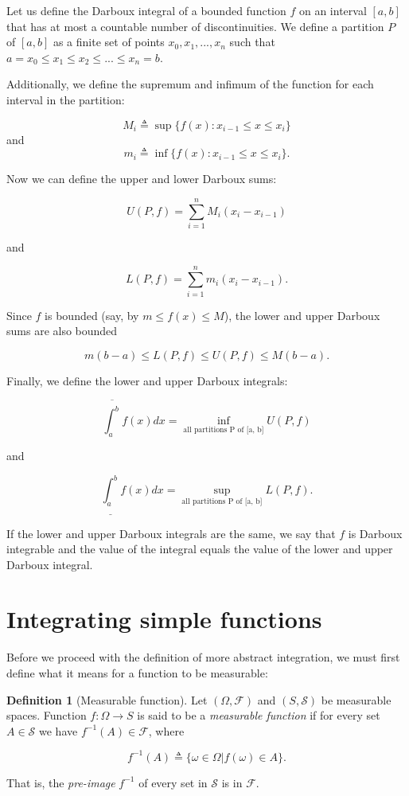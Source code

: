\documentclass{book}
\theoremstyle{plain}%
\theoremstyle{definition}
\newtheorem{definition}{Definition}[section]
\newlength{\arrow}
\begin{document}
Let us define the Darboux integral of a bounded function $f$ on an interval $[a,b]$ that has at most a countable number of discontinuities. We define a partition $P$ of $[a,b]$ as a finite set of points $x_0, x_1,...,x_n$ such that $a = x_0 \leq x_1 \leq x_2 \leq ... \leq x_n = b$.

Additionally, we define the supremum and infimum of the function for each interval in the partition:

$$M_i \triangleq \sup\{f(x): x_{i-1} \leq x \leq x_i \}$$ and $$m_i \triangleq \inf\{f(x): x_{i-1} \leq x \leq x_i \}.$$

Now we can define the upper and lower Darboux sums:

$$U(P, f) = \sum_{i=1}^n M_i (x_i - x_{i-1})$$

and

$$L(P, f) = \sum_{i=1}^n m_i (x_i - x_{i-1}).$$

Since $f$ is bounded (say, by $m \leq f(x) \leq M$), the lower and upper Darboux sums are also bounded

$$m(b-a) \leq L(P, f) \leq U(P, f) \leq M(b-a).$$

Finally, we define the lower and upper Darboux integrals:

$$\overline{\int_a^b} f(x)dx =  \inf_\text{all partitions P of [a, b]} U(P,f)$$

and

$$\underline{\int_a^b} f(x)dx =  \sup_\text{all partitions P of [a, b]} L(P,f).$$


If the lower and upper Darboux integrals are the same, we say that $f$ is Darboux integrable and the value of the integral equals the value of the lower and upper Darboux integral.

\section{Integrating simple functions}

Before we proceed with the definition of more abstract integration, we must first define what it means for a function to be measurable:

\begin{definition}[Measurable function]
Let $(\Omega, \mathcal{F})$ and $(S, \mathcal{S})$ be measurable spaces. Function $f: \Omega \rightarrow S$ is said to be a \emph{measurable function} if for every set $A \in \mathcal{S}$ we have $f^{-1}(A) \in \mathcal{F}$, where

$$f^{-1}(A) \triangleq \{\omega \in \Omega | f(\omega) \in A\}.$$

That is, the \emph{pre-image} $f^{-1}$ of every set in $\mathcal{S}$ is in $\mathcal{F}$.\label{def:measurable}
\end{definition}
\end{document}
